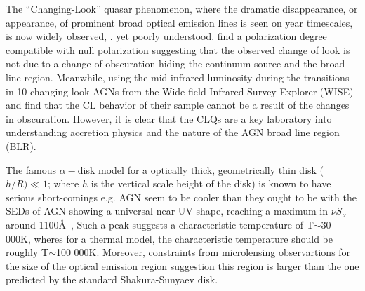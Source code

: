 \documentclass{nature}
\begin{document}

The ``Changing-Look'' quasar phenomenon, where the dramatic
disappearance, or appearance, of prominent broad optical emission
lines is seen on year timescales, is now widely observed,
\cite{LaMassa15, MacLeod16, Runnoe16, Ruan16, Gezari17, Rumbaugh17}.
yet poorly understood.
\citet{Hutsemekers17} find a polarization degree compatible with null
polarization suggesting that the observed change of look is not due to
a change of obscuration hiding the continuum source and the broad line
region.  Meanwhile, \cite{Sheng17} using the mid-infrared luminosity
during the transitions in 10 changing-look AGNs from the Wide-field
Infrared Survey Explorer (WISE) and find that the CL behavior of their
sample cannot be a result of the changes in obscuration.  However, it
is clear that the CLQs are a key laboratory into understanding
accretion physics and the nature of the AGN broad line region (BLR).

The famous $\alpha-$disk model \cite{SS73} for a optically thick,
geometrically thin disk ($h / R) \ll 1$; where $h$ is the vertical
scale height of the disk) is known to have serious short-comings
e.g. \cite{Antonucci99, Koratkar_Blaes99, Lawrence12} AGN seem to be
cooler than they ought to be \cite[e.g., ]{Lawrence12} with the SEDs
of AGN showing a universal near-UV shape, reaching a maximum in $\nu
S_{\nu}$ around 1100\AA\ , Such a peak suggests a characteristic
temperature of T$\sim$30 000K, wheres for a thermal model, the
characteristic temperature should be roughly T$\sim$100 000K.
Moreover, constraints from microlensing observartions for the size of
the optical emission region \cite[e.g., ]{Pooley07, Morgan10,
Morgan12, Mosquera11} suggestion this region is larger than the one
predicted by the standard Shakura-Sunyaev disk.
\end{document}
